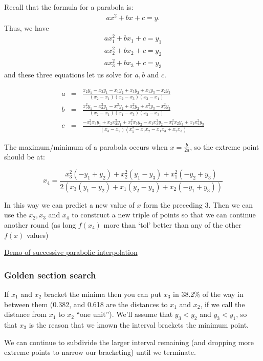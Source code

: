 \documentclass[11pt]{article}
\begin{document}
Recall that the formula for a parabola is:
\begin{eqnarray*}
	a x^2 + bx + c = y.
\end{eqnarray*}
Thus, we have
\begin{eqnarray*}
	a x_1^2 + bx_1 + c = y_1 \\
	a x_2^2 + bx_2 + c = y_2 \\
	a x_3^2 + bx_3 + c = y_3
\end{eqnarray*}
and these three equations let us solve for $a, b$ and $c$.

\begin{eqnarray*}
	a & = & \frac{x_2 y_1 - x_3 y_1 - x_1 y_2 + x_3 y_2 + x_1 y_3 -  x_2 y_3}{(x_2-x_1) (x_2 - x_3) (x_3-x_1)} \\
   b & = & \frac{x_2^2 y_1 - x_3^2 y_1 - x_1^2 y_2 + x_3^2 y_2 + x_1^2 y_3 - x_2^2 y_3}{(x_2-x_1) (x_1 - x_3) (x_2 - x_3)} \\
   c & = & \frac{-x_2^2 x_3 y_1 + x_2 x_3^2 y_1 + x_1^2 x_3 y_2 - x_1 x_3^2 y_2 - x_1^2 x_2 y_3 + x_1 x_2^2 y_3}{(x_3 - x_2) (x_1^2 - x_1 x_2 - x_1 x_3 + x_2 x_3)}
\end{eqnarray*}

The maximum/minimum of a parabola occurs when $x = \frac{b}{2a}$, so the extreme point should be at:

$$x_4 = \frac{x_3^2 (-y_1 + y_2) + x_2^2 (y_1 - y_3) + 
 x_1^2 (-y_2 + y_3)}{2 (x_3 (y_1 - y_2) + x_1 (y_2 - y_3) + x_2 (-y_1 + y_3))}$$
 
In this way we can predict a new value of $x$ form the preceding 3. 
Then we can use the $x_2, x_3$ and $x_4$ to construct a new triple of points so that we can continue another round (as long $f(x_4)$ more than `tol'  better than any of the other $f(x)$ values)


\href{http://www.cse.illinois.edu/iem/optimization/SuccessiveParabolic/}{Demo of successive parabolic interpolation}

\subsubsection*{Golden section search}
If $x_1$ and $x_2$ bracket the minima then you can put $x_3$ in 38.2\% of the way in between them (0.382, and 0.618 are the distances to $x_1$ and $x_2$, if we call the distance from $x_1$ to $x_2$ ``one unit'').
We'll assume that $y_3< y_2$ and $y_3< y_1$, so that $x_3$ is the reason that we known the interval brackets the minimum point.

We can continue to subdivide the larger interval remaining (and dropping more extreme points to narrow our bracketing) until we terminate.
\end{document}
